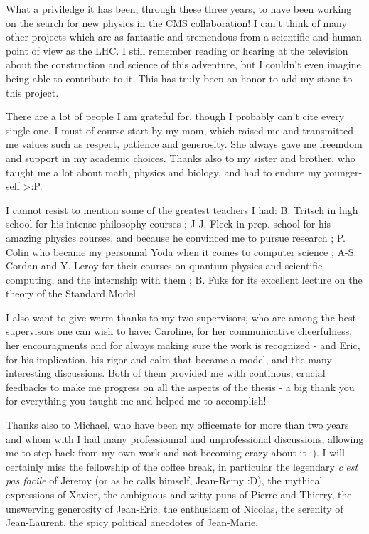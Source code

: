 \emptypage



What a priviledge it has been, through these three years, to have been working on the search
for new physics in the CMS collaboration! I can't think of many other projects which are 
as fantastic and tremendous from a scientific and human point of view as the LHC. I still
remember reading or hearing at the television about the construction and science of this
adventure, but I couldn't even imagine being able to contribute to it. This has truly been
an honor to add my stone to this project.

There are a lot of people I am grateful for, though I probably can't cite every single one.
I must of course start by my mom, which raised me and transmitted me values such as
respect, patience and generosity. She always gave me freemdom and support in my academic
choices. Thanks also to my sister and brother, who taught me a lot about math, physics and
biology, and had to endure my younger-self >:P.

I cannot resist to mention some of the greatest teachers I had: B. Tritsch in high 
school for his intense philosophy courses ; J-J. Fleck in prep. school for his amazing
physics courses, and because he convinced me to pursue research ; P. Colin who became my
personnal Yoda when it comes to computer science ; A-S. Cordan and Y. Leroy for their courses
on quantum physics and scientific computing, and the internship with them ; B. Fuks for its
excellent lecture on the theory of the Standard Model

I also want to give warm thanks to my two supervisors, who are among the best supervisors 
one can wish to have: Caroline, for her communicative cheerfulness, her encouragments and 
for always making sure the work is recognized - and Eric, for his implication, his rigor 
and calm that became a model, and the many interesting discussions. Both of them provided
me with continous, crucial feedbacks to make me progress on all the aspects of the thesis
- a big thank you for everything you taught me and helped me to accomplish!

Thanks also to Michael, who have been my officemate for more than two years and whom with
I had many professionnal and unprofessional discussions, allowing me to step back from
my own work and not becoming crazy about it :). I will certainly miss the fellowship of 
the coffee break, in particular the legendary \emph{c'est pas facile} of Jeremy (or
as he calls himself, Jean-Remy :D), the mythical expressions of Xavier, the ambiguous and 
witty puns of Pierre and Thierry, the unswerving generosity of Jean-Eric, the enthusiasm 
of Nicolas, the serenity of Jean-Laurent, the spicy political anecdotes of Jean-Marie,


